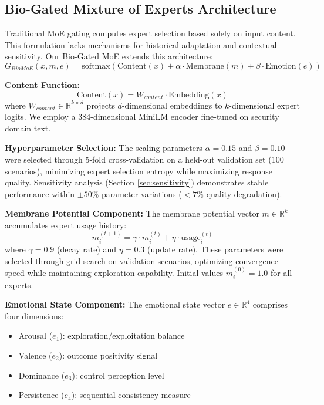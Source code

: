 \documentclass[preprint,12pt]{elsarticle}
\begin{document}
\subsection{Bio-Gated Mixture of Experts Architecture}

Traditional MoE gating computes expert selection based solely on input content. This formulation lacks mechanisms for historical adaptation and contextual sensitivity. Our Bio-Gated MoE extends this architecture:
\begin{equation}
G_{BioMoE}(x, m, e) = \text{softmax}\left(\text{Content}(x) + \alpha \cdot \text{Membrane}(m) + \beta \cdot \text{Emotion}(e)\right)
\end{equation}

\textbf{Content Function:}
\begin{equation}
\text{Content}(x) = W_{content} \cdot \text{Embedding}(x)
\end{equation}
where $W_{content} \in \mathbb{R}^{k \times d}$ projects $d$-dimensional embeddings to $k$-dimensional expert logits. We employ a 384-dimensional MiniLM encoder fine-tuned on security domain text.

\textbf{Hyperparameter Selection:} The scaling parameters $\alpha = 0.15$ and $\beta = 0.10$ were selected through 5-fold cross-validation on a held-out validation set (100 scenarios), minimizing expert selection entropy while maximizing response quality. Sensitivity analysis (Section \ref{sec:sensitivity}) demonstrates stable performance within $\pm 50\%$ parameter variations ($<7\%$ quality degradation).

\textbf{Membrane Potential Component:} The membrane potential vector $m \in \mathbb{R}^k$ accumulates expert usage history:
\begin{equation}
m_i^{(t+1)} = \gamma \cdot m_i^{(t)} + \eta \cdot \text{usage}_i^{(t)}
\end{equation}
where $\gamma = 0.9$ (decay rate) and $\eta = 0.3$ (update rate). These parameters were selected through grid search on validation scenarios, optimizing convergence speed while maintaining exploration capability. Initial values $m_i^{(0)} = 1.0$ for all experts.

\textbf{Emotional State Component:} The emotional state vector $e \in \mathbb{R}^4$ comprises four dimensions:
\begin{itemize}
    \item Arousal ($e_1$): exploration/exploitation balance
    \item Valence ($e_2$): outcome positivity signal
    \item Dominance ($e_3$): control perception level
    \item Persistence ($e_4$): sequential consistency measure
\end{itemize}
\end{document}
